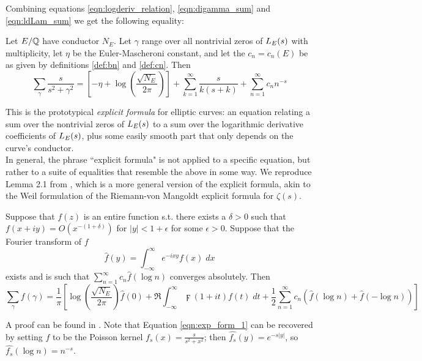 Combining equations \ref{eqn:logderiv_relation}, \ref{eqn:digamma_sum} and \ref{eqn:ldLam_sum} we get the following equality:
\begin{proposition}[GRH]
Let $E/\mathbb{Q}$ have conductor $N_E$. Let $\gamma$ range over all nontrivial zeros of $L_E(s)$ with multiplicity, let $\eta$ be the Euler-Mascheroni constant, and let the $c_n = c_n(E)$ be as given by definitions \ref{def:bn} and \ref{def:cn}. Then
\begin{equation}\label{eqn:exp_form_1}
\sum_{\gamma} \frac{s}{s^2 + \gamma^2} = \left[-\eta + \log\left(\frac{\sqrt{N_E}}{2\pi}\right)\right] + \sum_{k=1}^{\infty} \frac{s}{k(s+k)} + \sum_{n=1}^{\infty} c_n n^{-s}
\end{equation}
\end{proposition}
This is the prototypical {\it explicit formula} for elliptic curves: an equation relating a sum over the nontrivial zeros of $L_E(s)$ to a sum over the logarithmic derivative coefficients of $L_E(s)$, plus some easily smooth part that only depends on the curve's conductor. \\

In general, the phrase ``explicit formula" is not applied to a specific equation, but rather to a suite of equalities that resemble the above in some way. We reproduce Lemma 2.1 from \cite{Bob-2011}, which is a more general version of the explicit formula, akin to the Weil formulation of the Riemann-von Mangoldt explicit formula for $\zeta(s)$.
\begin{lemma}[GRH]
\label{lem:exp_form_2}
Suppose that $f(z)$ is an entire function s.t. there exists a $\delta>0$ such that $f(x+iy) = O(x^{-(1+\delta)})$ for $|y|<1+\epsilon$ for some $\epsilon>0$. Suppose that the Fourier transform of $f$
\begin{equation}
\hat{f}(y) = \int_{-\infty}^{\infty} e^{-i x y}f(x)\; dx
\end{equation}
exists and is such that $\sum_{n=1}^{\infty} c_n \hat{f}\left(\log n\right)$ converges absolutely. Then
\begin{equation}\label{eqn:exp_form_2}
\sum_{\gamma} f(\gamma) = \frac{1}{\pi}\left[\log\left(\frac{\sqrt{N_E}}{2\pi}\right)\hat{f}(0) + \Re\int_{-\infty}^{\infty} \digamma(1+it)f(t) \; dt  + \frac{1}{2} \sum_{n=1}^{\infty} c_n \left( \hat{f}\left(\log n\right) + \hat{f}\left(-\log n\right)\right) \right]
\end{equation}
\end{lemma}
A proof can be found in \cite[Theorem 5.12]{IwKo-2004}. Note that Equation \ref{eqn:exp_form_1} can be recovered by setting $f$ to be the Poisson kernel $f_s(x) = \frac{s}{s^2+x^2}$; then $\hat{f_s}(y) = e^{-s|y|}$, so $\hat{f_s}(\log n) = n^{-s}$. \\

